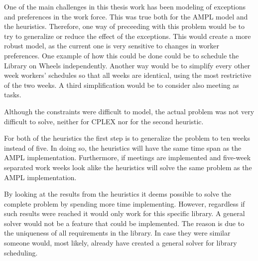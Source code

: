 One of the main challenges in this thesis work has been modeling of exceptions and preferences in the work force. This was true both for the AMPL model and the heuristics. Therefore, one way of preceeding with this problem would be to try to generalize or reduce the effect of the exceptions. This would create a more robust model, as the current one is very sensitive to  changes in worker preferences. One example of how this could be done could be to schedule the Library on Wheels independently. Another way would be to simplify every other week workers' schedules so that all weeks are identical, using the most restrictive of the two weeks. A third simplification would be to consider also meeting as tasks. 

Although the constraints were difficult to model, the actual problem was not very difficult to solve, neither for CPLEX nor for the second heuristic.  


For both of the heuristics the first step is to generalize the problem to ten weeks instead of five. In doing so, the heuristics will have the same time span as the AMPL implementation. Furthermore, if meetings are implemented and five-week separated work weeks look alike the heuristics will solve the same problem as the AMPL implementation. 

By looking at the results from the heuristics it deems possible to solve the complete problem by spending more time implementing. However, regardless if such results were reached it would only work for this specific library. A general solver would not be a feature that could be implemented. The reason is due to the uniqueness of all requirements in the library. In case they were similar someone would, most likely, already have created a general solver for library scheduling. 